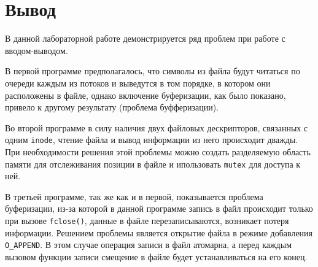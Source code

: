 \chapter{Вывод}

В данной лабораторной работе демонстрируется ряд проблем при работе с
вводом-выводом.

В первой программе предполагалось, что символы из файла будут читаться по
очереди каждым из потоков и выведутся в том порядке, в котором они
расположены в файле, однако включение буферизации, как было показано,
привело к другому результату (проблема буфферизации).

Во второй программе в силу наличия двух файловых дескрипторов, связанных с одним
\texttt{inode}, чтение файла и вывод информации из него происходит дважды. При
необходимости решения этой проблемы можно создать разделяемую область памяти для
отслеживания позиции в файле и ипользовать \texttt{mutex} для доступа к ней.

В третьей программе, так же как и в первой, показывается проблема буферизации,
из-за которой в данной программе запись в файл происходит только при вызове
\texttt{fclose()}, данные в файле перезаписываются, возникает потеря информации.
Решением проблемы является открытие файла в режиме добавления
\texttt{O\_APPEND}.  В этом случае операция записи в файл атомарна, а перед
каждым вызовом функции записи смещение в файле будет устанавливаться на его
конец.
